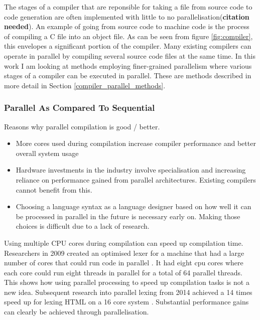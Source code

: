 The stages of a compiler that are reponsible for taking a file from
source code to code generation are often implemented with little to no
parallelisation(\textbf{citation needed}). An example of going from source code
to machine code is the process of compiling a C file into an object file. As
can be seen from figure \ref{fig:compiler}, this envelopes a significant portion
of the compiler. Many existing compilers can operate in parallel by compiling
several source code files at the same time. In this work I am looking at methods
employing finer-grained parallelism where various stages of a compiler can be
executed in parallel. These are methods described in more detail in Section
\ref{compiler_parallel_methods}.


\subsubsection{Parallel As Compared To Sequential}
\begin{sectionplan}
     Reasons why parallel compilation is good / better.

     \begin{itemize}
          \item More cores used during compilation increase compiler performance
                and better overall system usage

          \item Hardware investments in the industry involve specialisation
                and increasing reliance on performance gained from parallel
                architectures. Existing compilers cannot benefit from this.

          \item Choosing a language syntax as a language designer based on how
                well it can be processed in parallel in the future is necessary
                early on. Making those choices is difficult due to a lack of
                research.
     \end{itemize}
\end{sectionplan}

Using multiple CPU cores during compilation can speed up compilation time.
Researchers in 2009 created an optimised lexer for a machine that had a large
number of cores that could run code in parallel
\citep{scarpazza_high-performance_2009}. It had eight cpu cores where each core
could run eight threads in parallel for a total of 64 parallel threads.  This
shows how using parallel processing to speed up compilation tasks is not a new
idea. Subsequent research into parallel lexing from 2014 achieved a 14 times
speed up for lexing HTML on a 16 core system
\citep{mytkowicz_data-parallel_2014}. Substantial performance gains can clearly
be achieved through parallelisation.

